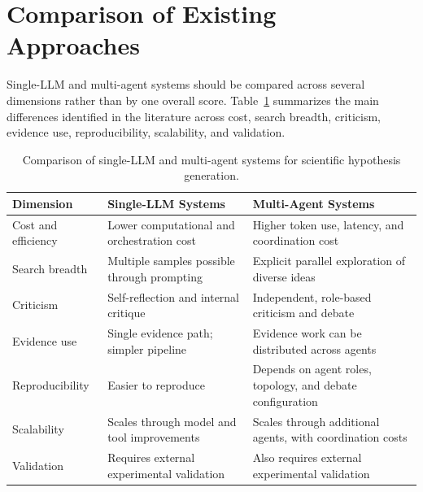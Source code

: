 \documentclass[11pt]{article}
\begin{document}
\section{Comparison of Existing Approaches}
\label{sec:comparison}

Single-LLM and multi-agent systems should be compared across several dimensions rather than by
one overall score. Table~\ref{tab:system-comparison} summarizes the main differences identified in
the literature across cost, search breadth, criticism, evidence use, reproducibility, scalability, and
validation.

\begin{table}[htbp]
  \centering
  \caption{Comparison of single-LLM and multi-agent systems for scientific hypothesis generation.}
  \label{tab:system-comparison}
  \small
  \renewcommand{\arraystretch}{1.2}
  \begin{tabularx}{\textwidth}{@{}>{\raggedright\arraybackslash}p{}
                                  >{\raggedright\arraybackslash}X
                                  >{\raggedright\arraybackslash}X@{}}
    \toprule
    \textbf{Dimension} & \textbf{Single-LLM Systems} & \textbf{Multi-Agent Systems} \\
    \midrule
    Cost and efficiency & Lower computational and orchestration cost
                        & Higher token use, latency, and coordination cost \\
    Search breadth      & Multiple samples possible through prompting
                        & Explicit parallel exploration of diverse ideas \\
    Criticism           & Self-reflection and internal critique
                        & Independent, role-based criticism and debate \\
    Evidence use        & Single evidence path; simpler pipeline
                        & Evidence work can be distributed across agents \\
    Reproducibility     & Easier to reproduce
                        & Depends on agent roles, topology, and debate configuration \\
    Scalability         & Scales through model and tool improvements
                        & Scales through additional agents, with coordination costs \\
    Validation          & Requires external experimental validation
                        & Also requires external experimental validation \\
    \bottomrule
  \end{tabularx}
\end{table}
\end{document}
